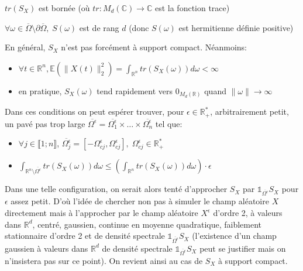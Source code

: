 \begin{hypothesis}
  $tr(S_X)$ est bornée (où $tr: M_d(\mathbb{\mathbb{C}}) \rightarrow \mathbb{C}$ est la fonction trace) \label{hyp2} 
\end{hypothesis}

\begin{hypothesis}
$\forall \omega \in \overline{\Omega} \setminus \partial\overline{\Omega}, \; S(\omega)$ est de rang $d$ (donc $S(\omega)$ est hermitienne définie positive)
\end{hypothesis}


\noindent En général, $S_X$ n'est pas forcément à support compact. Néanmoins:
\begin{itemize}
\item $\forall t \in \mathbb{R}^n, \mathbb{E}(\|X(t)\|_{2}^{2}) = \int_{\mathbb{R}^n} tr(S_X(\omega)) d\omega < \infty$ 
\item en pratique, $S_X(\omega)$ tend rapidement vers $ 0_{M_d(\mathbb{R})}$ quand $\|\omega \| \rightarrow \infty$ \\
\end{itemize}

\noindent Dans ces conditions on peut espérer trouver, pour $\epsilon \in \mathbb{R}^{*}_{+}$, arbitrairement petit, un pavé pas trop large $\overline{\Omega^{\epsilon}} = \overline{\Omega_{1}^{\epsilon}} \times \dots \times \overline{\Omega_{n}^{\epsilon}}$ tel que:
\begin{itemize}
\item $\forall j \in \llbracket 1; n \rrbracket$, $\overline{\Omega_{j}^{\epsilon}} = [-\Omega_{cj}^{\epsilon},\Omega_{cj}^{\epsilon}], \; \Omega_{cj}^{\epsilon} \in \mathbb{R}^{*}_{+}$
\item $ \int_{\mathbb{R}^n \setminus \overline{\Omega^{\epsilon}}} tr(S_X(\omega)) d\omega \leq (\int_{\mathbb{R}^n} tr(S_X(\omega)) d\omega) \cdot \epsilon$\\
\end{itemize}

Dans une telle configuration, on serait alors tenté d'approcher $S_X$ par $\mathds{1}_{\overline{\Omega^{\epsilon}}}S_X$ pour $\epsilon$ assez petit. D'où l'idée de chercher non pas à simuler le champ aléatoire $X$ directement mais à l'approcher par le champ aléatoire $X^{\epsilon}$ d'ordre 2, à valeurs dans $\mathbb{R}^d$, centré, gaussien, continue en moyenne quadratique, faiblement stationnaire d'ordre 2 et de
densité spectrale $\mathds{1}_{\overline{\Omega^{\epsilon}}}S_X$ (l'existence d'un champ gaussien à valeurs dans $\mathbb{R}^d$ de densité spectrale $\mathds{1}_{\overline{\Omega^{\epsilon}}}S_X$ peut se justifier mais on n'insistera pas sur ce point).
On revient ainsi au cas de $S_X$ à support compact. 

